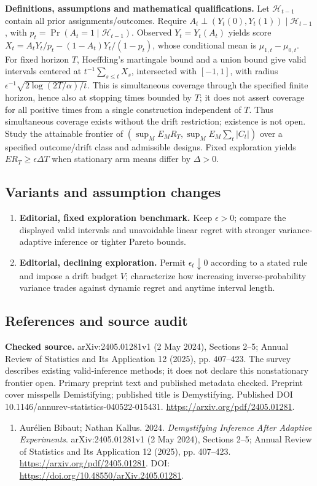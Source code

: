 \documentclass[11pt,a4paper]{article}
\begin{document}
\textbf{Definitions, assumptions and mathematical qualifications.} Let \(\mathcal H_{t-1}\) contain all prior assignments/outcomes. Require \(A_t\perp(Y_t(0),Y_t(1))\mid\mathcal H_{t-1}\), with \(p_t=\Pr(A_t=1\mid\mathcal H_{t-1})\). Observed \(Y_t=Y_t(A_t)\) yields score \(X_t=A_tY_t/p_t-(1-A_t)Y_t/(1-p_t)\), whose conditional mean is \(\mu_{1,t}-\mu_{0,t}\). For fixed horizon \(T\), Hoeffding's martingale bound and a union bound give valid intervals centered at \(t^{-1}\sum_{s\leq t}X_s\), intersected with \([-1,1]\), with radius \(\epsilon^{-1}\sqrt{2\log(2T/\alpha)/t}\). This is simultaneous coverage through the specified finite horizon, hence also at stopping times bounded by \(T\); it does not assert coverage for all positive times from a single construction independent of \(T\). Thus simultaneous coverage exists without the drift restriction; existence is not open. Study the attainable frontier of \((\sup_M E_MR_T,\sup_M E_M\sum_t|C_t|)\) over a specified outcome/drift class and admissible designs. Fixed exploration yields \(E R_T\geq\epsilon\Delta T\) when stationary arm means differ by \(\Delta>0\).
\subsection*{Variants and assumption changes}
\begin{enumerate}
\item \textbf{Editorial, fixed exploration benchmark.} Keep \(\epsilon>0\); compare the displayed valid intervals and unavoidable linear regret with stronger variance-adaptive inference or tighter Pareto bounds.
\item \textbf{Editorial, declining exploration.} Permit \(\epsilon_t\downarrow0\) according to a stated rule and impose a drift budget \(V\); characterize how increasing inverse-probability variance trades against dynamic regret and anytime interval length.
\end{enumerate}
\subsection*{References and source audit}
\textbf{Checked source.} arXiv:2405.01281v1 (2 May 2024), Sections 2--5; Annual Review of Statistics and Its Application 12 (2025), pp. 407--423. The survey describes existing valid-inference methods; it does not declare this nonstationary frontier open. Primary preprint text and published metadata checked. Preprint cover misspells Demistifying; published title is Demystifying. Published DOI 10.1146/annurev-statistics-040522-015431. \url{https://arxiv.org/pdf/2405.01281}.
\begin{enumerate}\raggedright
\item\hypertarget{definitions:source:30007710:1}{} Aurélien Bibaut; Nathan Kallus. 2024. \emph{Demystifying Inference After Adaptive Experiments}. arXiv:2405.01281v1 (2 May 2024), Sections 2--5; Annual Review of Statistics and Its Application 12 (2025), pp. 407--423.
\url{https://arxiv.org/pdf/2405.01281}.
DOI: \url{https://doi.org/10.48550/arXiv.2405.01281}.
\end{enumerate}
\end{document}
